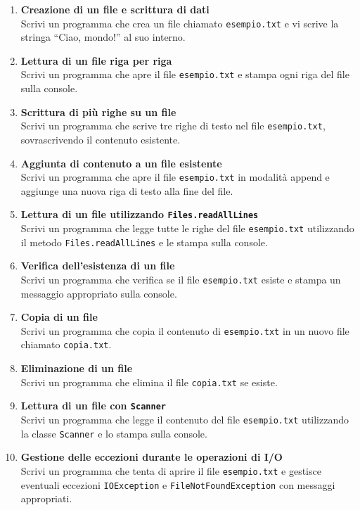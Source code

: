 \documentclass{article}
\begin{document}
\begin{enumerate}
    \item \textbf{Creazione di un file e scrittura di dati} \\
    Scrivi un programma che crea un file chiamato \texttt{esempio.txt} e vi scrive la stringa ``Ciao, mondo!'' al suo interno.

    \item \textbf{Lettura di un file riga per riga} \\
    Scrivi un programma che apre il file \texttt{esempio.txt} e stampa ogni riga del file sulla console.

    \item \textbf{Scrittura di più righe su un file} \\
    Scrivi un programma che scrive tre righe di testo nel file \texttt{esempio.txt}, sovrascrivendo il contenuto esistente.

    \item \textbf{Aggiunta di contenuto a un file esistente} \\
    Scrivi un programma che apre il file \texttt{esempio.txt} in modalità append e aggiunge una nuova riga di testo alla fine del file.

    \item \textbf{Lettura di un file utilizzando \texttt{Files.readAllLines}} \\
    Scrivi un programma che legge tutte le righe del file \texttt{esempio.txt} utilizzando il metodo \texttt{Files.readAllLines} e le stampa sulla console.

    \item \textbf{Verifica dell'esistenza di un file} \\
    Scrivi un programma che verifica se il file \texttt{esempio.txt} esiste e stampa un messaggio appropriato sulla console.

    \item \textbf{Copia di un file} \\
    Scrivi un programma che copia il contenuto di \texttt{esempio.txt} in un nuovo file chiamato \texttt{copia.txt}.

    \item \textbf{Eliminazione di un file} \\
    Scrivi un programma che elimina il file \texttt{copia.txt} se esiste.

    \item \textbf{Lettura di un file con \texttt{Scanner}} \\
    Scrivi un programma che legge il contenuto del file \texttt{esempio.txt} utilizzando la classe \texttt{Scanner} e lo stampa sulla console.

    \item \textbf{Gestione delle eccezioni durante le operazioni di I/O} \\
    Scrivi un programma che tenta di aprire il file \texttt{esempio.txt} e gestisce eventuali eccezioni \texttt{IOException} e \texttt{FileNotFoundException} con messaggi appropriati.
\end{enumerate}
\end{document}
